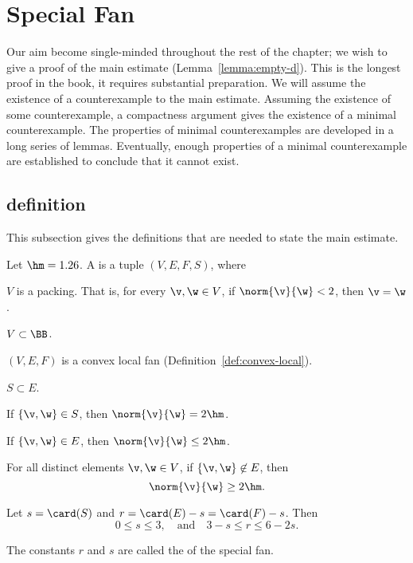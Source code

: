 \section{Special Fan}\label{sec:weight}  

Our aim become single-minded throughout the rest of the chapter; we
wish to give a proof of the main estimate (Lemma~\ref{lemma:empty-d}).
This is the longest proof in the book, it requires substantial
preparation.  We will assume the existence of a counterexample to the
main estimate.  Assuming the existence of some counterexample, a
compactness argument gives the existence of a minimal counterexample.
The properties of minimal counterexamples are developed in a long
series of lemmas.  Eventually, enough properties of a minimal
counterexample are established to conclude that it cannot exist.




\subsection{definition}

This subsection gives the definitions that are needed to state the
main estimate.

\begin{definition}
Let $\hm = 1.26$.
A  is a tuple $(V,E,F,S)$, where
\begin{description}
\item {} $V$ is a packing.  That is, for every $\v,\w\in
V$, if $\norm{\v}{\w}<2$, then $\v=\w$.
\item {} $V\subset \BB$.
\item {} $(V,E,F)$ is a convex local fan (Definition~\ref{def:convex-local}).
\item {} $S\subset E$.
\item {} If $\{\v,\w\}\in S$, then $\norm{\v}{\w}=2\hm$.
\item {} If $\{\v,\w\}\in E$, then $\norm{\v}{\w}\le 2\hm$.
\item {} For all distinct elements $\v,\w\in V$, if
$\{\v,\w\}\not\in E$, then \begin{displaymath}\norm{\v}{\w}\ge
2\hm.\end{displaymath}
\item {} %
Let      $s=\card(S)$ and $r=\card(E) - s = \card(F)-s$.  Then
\begin{displaymath}0\le s \le 3,\quad\text{and}\quad3-s \le r \le 6 -
2s.\end{displaymath}
\end{description}
The constants $r$ and $s$ are called the  of the special fan.
\end{definition}


